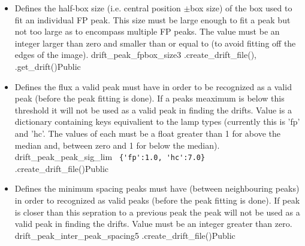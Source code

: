 \begin{itemize}
\item \label{text:drift_peak_fpbox_size} 
{Defines the half-box size (i.e. central position $\pm$box size) of the box used to fit an individual FP peak. This size must be large enough to fit a peak but not too large as to encompass multiple FP peaks. The value must be an integer larger than zero and smaller than or equal to  (to avoid fitting off the edges of the image).}
{drift\_peak\_fpbox\_size}{3}
{\calDRIFTPEAK}{\constantsfile}{\spirouRV.create\_drift\_file(), \spirouRV.get\_drift()}{Public}



\item {}
{Defines the flux a valid peak must have in order to be recognized as a valid peak (before the peak fitting is done). If a peaks meaximum is below this threshold it will not be used as a valid peak in finding the drifts. Value is a dictionary containing keys equivalient to the lamp types (currently this is 'fp' and 'hc'. The values of each must be a float greater than 1 for above the median and, between zero and 1 for below the median).}
{drift\_peak\_peak\_sig\_lim}
{\lstinline[style=pythoninline]| {'fp':1.0, 'hc':7.0} |}
{\calDRIFTPEAK}{\constantsfile}{\spirouRV.create\_drift\_file()}{Public}


\item {}
{Defines the minimum spacing peaks must have (between neighbouring peaks) in order to recognized as valid peaks (before the peak fitting is done). If peak is closer than this sepration to a previous peak the peak will not be used as a valid peak in finding the drifts. Value must be an integer greater than zero.}
{drift\_peak\_inter\_peak\_spacing}{5}
{\calDRIFTPEAK}{\constantsfile}{\spirouRV.create\_drift\_file()}{Public}



\end{itemize}
